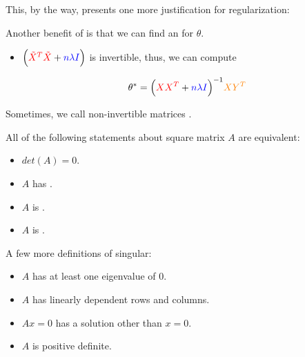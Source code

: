         This, by the way, presents one more justification for regularization:\\

        \begin{concept}
            Another benefit of  is that we can  find an  for $\theta$.

            \begin{itemize}
                \item $\Big ( \textcolor{red}{\tilde{X}^T \tilde{X}} + \textcolor{blue}{n \lambda I} \Big)$ is invertible, thus, we can compute 

                \begin{equation*}
                    \theta^* = \Big ( \textcolor{red}{X X^T} + \textcolor{blue}{n \lambda I} \Big)^{-1} \textcolor{orange}{XY^T}
                \end{equation*}
            \end{itemize}
        \end{concept}

        Sometimes, we call non-invertible matrices .\\

        \begin{definition}
            All of the following statements about square matrix $A$ are equivalent:

            \begin{itemize}
                \item $det(A)=0$.
                \item $A$ has .
                \item $A$ is .
                \item $A$ is .
            \end{itemize}

            
        \end{definition}

        A few more definitions of singular:

        \begin{itemize}
            \item $A$ has at least one eigenvalue of 0.
            \item $A$ has linearly dependent rows and columns.
            \item $Ax=0$ has a solution other than $x=0$.
            \item $A$ is positive definite.
        \end{itemize}


